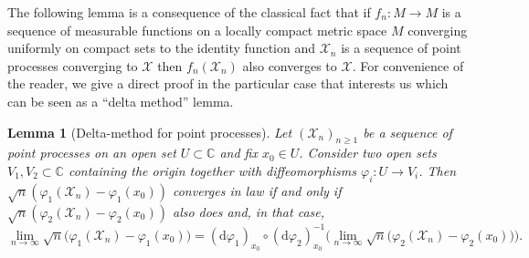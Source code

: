 \documentclass[10pt,reqno]{amsart}
\newcommand{\<}{\langle}
\renewcommand{\>}{\rangle}
\numberwithin{equation}{section}
\newtheorem{lemma}[theorem]{Lemma}%
\begin{document}
The following lemma is a consequence of the
classical fact that if $f_n:M \to M$
is a sequence of measurable functions on
a locally compact metric space $M$ converging uniformly on
compact sets to the identity function and
$\mathcal X_n$ is a sequence of point processes
converging to $\mathcal X$
then $f_n(\mathcal X_n)$ also converges to $\mathcal X$. 
For convenience
of the reader, we give
a direct proof in the particular case
that interests us which can be seen
as a ``delta method'' lemma. 

\begin{lemma}[Delta-method for point processes] \label{lem:ChangeOfCoordinates}
Let $(\mathcal X_n)_{n \geq 1}$ be a sequence
of point processes on an open set 
$U \subset \mathbb C$ and fix $x_0 \in U$. Consider two open sets $V_1,V_2 \subset \mathbb C$
containing the origin 
together with diffeomorphisms
$\varphi_i: U \to V_i$.
 Then
$\sqrt n (\varphi_1(\mathcal X_n) - 
\varphi_1(x_0))$
converges in law if and only if $\sqrt n (\varphi_2(\mathcal X_n) - \varphi_2(x_0))$
also does and, in that case,
\[\lim_{n \to \infty}
\sqrt n \big(\varphi_1(\mathcal X_n) - \varphi_1(x_0) \big)
=
(\mathrm d \varphi_1)_{x_0} \circ
(\mathrm d \varphi_2)_{x_0}^{-1}
\Big(\lim_{n \to \infty}
\sqrt n \big(\varphi_2(\mathcal X_n) - \varphi_2(x_0)\big)\Big).\]
\end{lemma}
\end{document}
